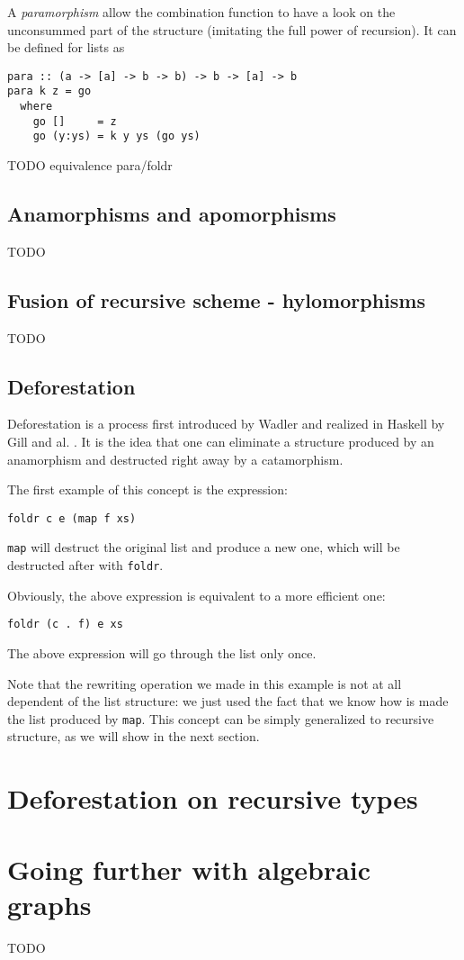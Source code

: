 \documentclass[format=sigplan]{acmart}
\newcommand{\minline}[1]{\texttt{#1}}
\begin{document}
A \emph{paramorphism} allow the combination function to have a look on the unconsummed part of the structure (imitating the full power of recursion). It can be defined for lists as

\begin{verbatim}
para :: (a -> [a] -> b -> b) -> b -> [a] -> b
para k z = go
  where
    go []     = z
    go (y:ys) = k y ys (go ys)
\end{verbatim}

TODO equivalence para/foldr

\subsection{Anamorphisms and apomorphisms}
TODO

\subsection{Fusion of recursive scheme - hylomorphisms}
TODO

\subsection{Deforestation}
Deforestation is a process first introduced by Wadler \cite{WADLER1990231} and realized in Haskell by Gill and al. \cite{Gill:1993:SCD:165180.165214}. It is the idea that one can eliminate a structure produced by an anamorphism and destructed right away by a catamorphism.

The first example of this concept is the expression:
\begin{verbatim}
foldr c e (map f xs)
\end{verbatim}
\minline{map} will destruct the original list and produce a new one, which will be destructed after with \minline{foldr}.

Obviously, the above expression is equivalent to a more efficient one:
\begin{verbatim}
foldr (c . f) e xs
\end{verbatim}
The above expression will go through the list only once.

Note that the rewriting operation we made in this example is not at all dependent of the list structure: we just used the fact that we know how is made the list produced by \minline{map}. This concept can be simply generalized to recursive structure, as we will show in the next section.

\section{Deforestation on recursive types}


\section{Going further with algebraic graphs}


\begin{acks}
TODO
\end{acks}
	



\end{document}
